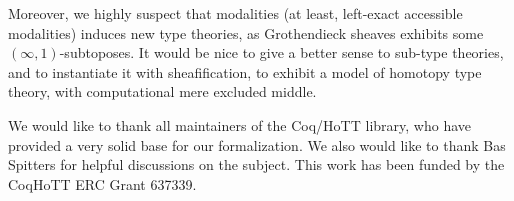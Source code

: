 \documentclass[notfinal]{jfrarticle}
\begin{document}
Moreover, we highly suspect that modalities (at least, left-exact
accessible modalities) induces new type theories, as Grothendieck
sheaves exhibits some $(\infty,1)$-subtoposes. It would be nice to
give a better sense to sub-type theories, and to instantiate it with
sheafification, to exhibit a model of homotopy type theory, with
computational mere excluded middle.


\begin{acks}
  

We would like to thank all maintainers of the Coq/HoTT library, who
have provided a very solid base for our formalization. 
%
We also would like to thank Bas Spitters for helpful discussions on
the subject.
%
This work has been funded by the CoqHoTT ERC Grant 637339.
\end{acks}









\end{document}
